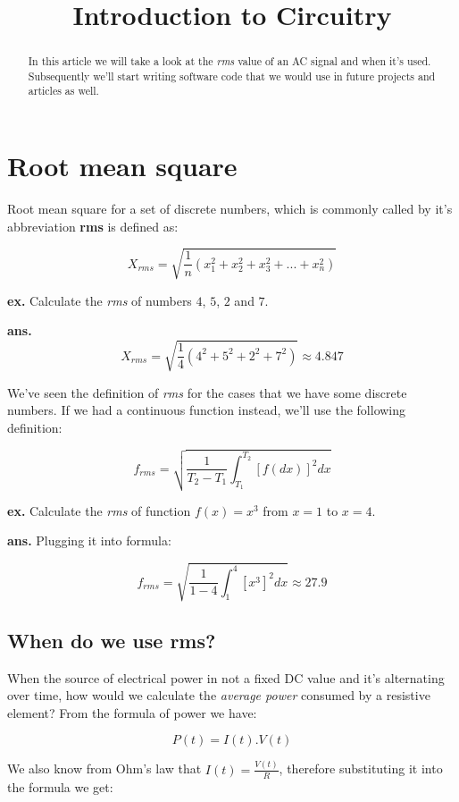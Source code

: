 \documentclass{article}
\begin{document}
	
	\title{Introduction to Circuitry}
	\author{}
	
	\maketitle
	
	\begin{abstract}
	In this article we will take a look at the \textit{rms} value of an AC signal and when it's used. Subsequently we'll start writing software code that we would use in future projects and articles as well.

	\end{abstract}
	
	\section{Root mean square}
	Root mean square for a set of discrete numbers, which is commonly called by it's abbreviation \textbf{rms} is defined as:
	
	$$ X_{rms} = \sqrt{\frac{1}{n}(x_1^2 + x_2^2 + x_3^2 + ... + x_n^2 )} $$

	\textbf{ex.} Calculate the \textit{rms} of numbers $4$, $5$, $2$ and $7$.
	
	\textbf{ans.} $$ X_{rms} = \sqrt{\frac{1}{4}(4^2 + 5^2 + 2^2 + 7^2)} \approx 4.847 $$
	
	We've seen the definition of \textit{rms} for the cases that we have some discrete numbers. If we had a continuous function instead, we'll use the following definition:
	
	$$ f_{rms} = \sqrt{\frac{1}{T_2 - T_1} \int_{T_1}^{T_2} [f(dx)]^2 dx } $$
	
	\textbf{ex.} Calculate the \textit{rms} of function $f(x) = x^3$ from $x = 1$ to $x = 4$.
	
	\textbf{ans.} Plugging it into formula:
	
	$$ f_{rms} = \sqrt{\frac{1}{1 - 4} \int_{1}^{4} [x^3]^2 dx } \approx 27.9 $$

	\subsection{When do we use rms?}
	When the source of electrical power in not a fixed DC value and it's alternating over time, how would we calculate the \textit{average power} consumed by a resistive element? From the formula of power we have:
	
	$$P(t) = I(t).V(t)$$

	We also know from Ohm's law that $I(t) = \frac{V(t)}{R}$, therefore substituting it into the formula we get:
	
\end{document}
